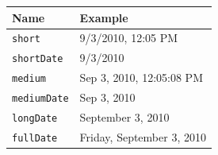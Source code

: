 \documentclass[12pt,]{article}
\begin{document}
\begin{longtable}[c]{@{}ll@{}}
\toprule
\begin{minipage}[b]{0.20\columnwidth}\raggedright\strut
Name
\strut\end{minipage} &
\begin{minipage}[b]{0.37\columnwidth}\raggedright\strut
Example
\strut\end{minipage}\tabularnewline
\midrule
\endhead
\begin{minipage}[t]{0.20\columnwidth}\raggedright\strut
\texttt{short}
\strut\end{minipage} &
\begin{minipage}[t]{0.37\columnwidth}\raggedright\strut
9/3/2010, 12:05 PM
\strut\end{minipage}\tabularnewline
\begin{minipage}[t]{0.20\columnwidth}\raggedright\strut
\texttt{shortDate}
\strut\end{minipage} &
\begin{minipage}[t]{0.37\columnwidth}\raggedright\strut
9/3/2010
\strut\end{minipage}\tabularnewline
\begin{minipage}[t]{0.20\columnwidth}\raggedright\strut
\texttt{medium}
\strut\end{minipage} &
\begin{minipage}[t]{0.37\columnwidth}\raggedright\strut
Sep 3, 2010, 12:05:08 PM
\strut\end{minipage}\tabularnewline
\begin{minipage}[t]{0.20\columnwidth}\raggedright\strut
\texttt{mediumDate}
\strut\end{minipage} &
\begin{minipage}[t]{0.37\columnwidth}\raggedright\strut
Sep 3, 2010
\strut\end{minipage}\tabularnewline
\begin{minipage}[t]{0.20\columnwidth}\raggedright\strut
\texttt{longDate}
\strut\end{minipage} &
\begin{minipage}[t]{0.37\columnwidth}\raggedright\strut
September 3, 2010
\strut\end{minipage}\tabularnewline
\begin{minipage}[t]{0.20\columnwidth}\raggedright\strut
\texttt{fullDate}
\strut\end{minipage} &
\begin{minipage}[t]{0.37\columnwidth}\raggedright\strut
Friday, September 3, 2010
\strut\end{minipage}\tabularnewline

\end{longtable}
\end{document}
